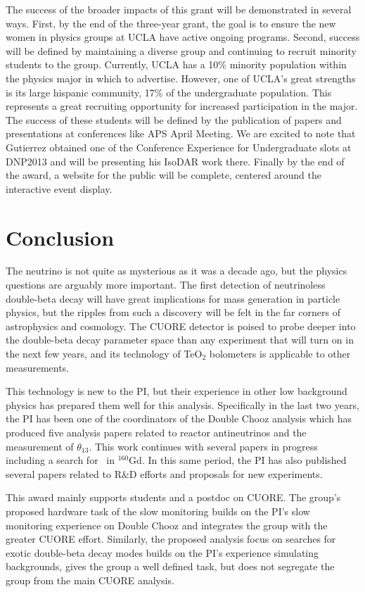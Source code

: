 The success of the broader impacts of this grant will be demonstrated in several ways.   First, by the end of the three-year grant, the goal is to ensure the new women in physics groups at UCLA have active ongoing programs.  Second, success will be defined by maintaining a diverse group and continuing to recruit minority students to the group. Currently, UCLA has a 10\% minority population within the physics major in which to advertise. However, one of UCLA's great strengths is its large hispanic community, 17\% of the undergraduate population. This represents a great recruiting opportunity for increased participation in the major. The success  of these students will be defined by the publication of papers and presentations at  conferences like APS April Meeting. We are excited to note that  Gutierrez obtained one of the Conference Experience for Undergraduate slots at DNP2013 and will be presenting his IsoDAR work there. Finally by the end of the award, a website for the public will be complete, centered around the interactive event display.

\section{Conclusion}
The neutrino is not quite as mysterious as it was a decade ago, but the physics questions are arguably more important. The first detection of neutrinoless double-beta decay will have great implications for mass generation in particle physics, but the ripples from such a discovery will be felt in the far corners of astrophysics and cosmology. The CUORE  detector is poised to probe deeper into the double-beta decay parameter space than any experiment that will turn on in the next few years, and its technology of TeO$_2$ bolometers is applicable to other measurements.

This technology is new to the PI, but their experience in other low background physics has prepared them well for this analysis. Specifically in the last two years, the PI has been one of the coordinators of the Double Chooz  analysis which has produced five analysis papers related to reactor antineutrinos and the measurement of $\theta_{13}$\cite{dcone, dctwo, takahama,Abe:2012gw,Abe:2012ar}. This work continues with several papers in progress including a search for \zeronu~in $^{160}$Gd. In this same period, the PI has also published several papers related to R\&D efforts and proposals for new experiments\cite{Alonso:2010fs,isodar,qdot,Lopez201222}.

This award mainly supports students and a postdoc on CUORE. The group's proposed hardware task of the slow monitoring builds on the PI's slow monitoring experience on Double Chooz and integrates the group with the greater CUORE effort. Similarly, the proposed analysis focus on searches for exotic double-beta decay modes builds on the PI's experience simulating backgrounds, gives the group a well defined task, but does not segregate the group from the main CUORE analysis. 

